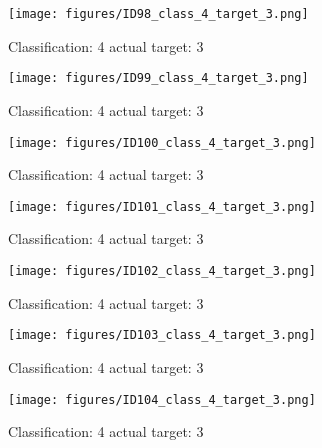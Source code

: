 \begin{figure}[h!]
\begin{center}
\texttt{[image: figures/ID98\_class\_4\_target\_3.png]}
\end{center}
\caption{ Classification: 4 actual target: 3}
\label{fig:ID98_class_4_target_3}
\end{figure}
\begin{figure}[h!]
\begin{center}
\texttt{[image: figures/ID99\_class\_4\_target\_3.png]}
\end{center}
\caption{ Classification: 4 actual target: 3}
\label{fig:ID99_class_4_target_3}
\end{figure}
\begin{figure}[h!]
\begin{center}
\texttt{[image: figures/ID100\_class\_4\_target\_3.png]}
\end{center}
\caption{ Classification: 4 actual target: 3}
\label{fig:ID100_class_4_target_3}
\end{figure}
\begin{figure}[h!]
\begin{center}
\texttt{[image: figures/ID101\_class\_4\_target\_3.png]}
\end{center}
\caption{ Classification: 4 actual target: 3}
\label{fig:ID101_class_4_target_3}
\end{figure}
\begin{figure}[h!]
\begin{center}
\texttt{[image: figures/ID102\_class\_4\_target\_3.png]}
\end{center}
\caption{ Classification: 4 actual target: 3}
\label{fig:ID102_class_4_target_3}
\end{figure}
\begin{figure}[h!]
\begin{center}
\texttt{[image: figures/ID103\_class\_4\_target\_3.png]}
\end{center}
\caption{ Classification: 4 actual target: 3}
\label{fig:ID103_class_4_target_3}
\end{figure}
\begin{figure}[h!]
\begin{center}
\texttt{[image: figures/ID104\_class\_4\_target\_3.png]}
\end{center}
\caption{ Classification: 4 actual target: 3}
\label{fig:ID104_class_4_target_3}
\end{figure}
